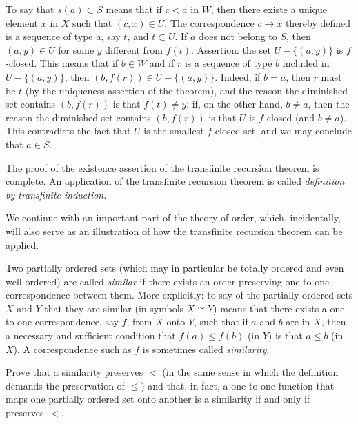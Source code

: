 To say that $s(a) \subset S$ means that if $c < a$ in $W$, then there existe a unique element $x$ in $X$ such that $(c, x) \in U$. The correspondence $c \rightarrow x$ thereby defined is a sequence of type $a$, say $t$, and $t \subset U$. If $a$ does not belong to $S$, then $(a,y) \in U$ for some $y$ different from $f(t)$. Assertion: the set $U - \{ (a, y) \}$ is $f$-closed. This means that if $b \in W$ and if $r$ is a sequence of type $b$ included in $U - \{ (a, y) \}$, then $(b,f(r)) \in U - \{ (a, y) \}$. Indeed, if $b =a$, then $r$ must be $t$ (by the uniqueness assertion of the theorem), and the reason the diminished set contains $(b, f(r))$ is that $f(t) \neq y$; if, on the other hand, $b \neq a$, then the reason the diminished set contains $(b,f(r))$ is that $U$ is $f$-closed (and $b \neq a$). This contradicts the fact that $U$ is the smallest $f$-closed set, and we may conclude that $a \in S$. 

The proof of the existence assertion of the transfinite recursion theorem is complete. An application of the transfinite recursion theorem is called \textit{definition by transfinite induction}. 

We continue with an important part of the theory of order, which, incidentally, will also serve as an illustration of how the transfinite recursion theorem can be applied. 

Two partially ordered sets (which may in particular be totally ordered and even well ordered) are called \textit{similar} if there exists an order-preserving one-to-one correspondence between them. More explicitly: to say of the partially ordered sets $X$ and $Y$ that they are similar (in symbols $X \cong Y$) means that there exists a one-to-one correspondence, say $f$, from $X$ onto $Y$, such that if $a$ and $b$ are in $X$, then a necessary and sufficient condition that $f(a) \le f(b)$ (in $Y$) is that $a \le b$ (in $X$). A correspondence such as $f$ is sometimes called \textit{similarity}. 

\begin{exercise} Prove that a similarity preserves $<$ (in the same sense in which the definition demands the preservation of $\le$) and that, in fact, a one-to-one function that maps one partially ordered set onto another is a similarity if and only if preserves~$<$.
\end{exercise}

